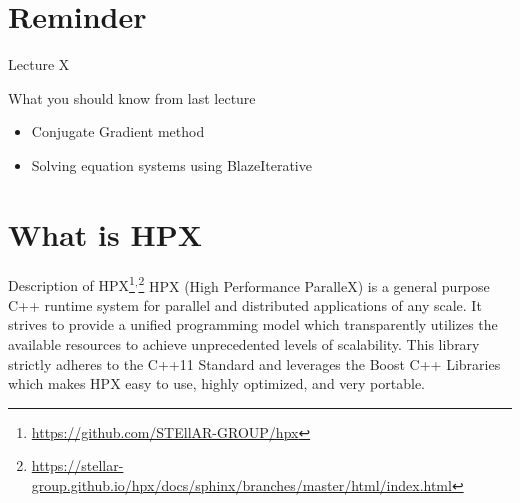 \documentclass[12pt,t]{beamer}
\title{\coursename}
\subtitle{Lecture 11: Introduction to HPX}
\date {
 \tiny \url{\courseurl}
\vspace{2cm}
\doclicenseThis  
  
}
\begin{document}
 {
    \frame {
        \titlepage
    }
}

\frame{

\tableofcontents

}


\section{Reminder}
\begin{frame}{Lecture X}
\begin{block}{What you should know from last lecture}
\begin{itemize}
\item Conjugate Gradient method
\item Solving equation systems using BlazeIterative
\end{itemize}
\end{block}
\end{frame}


\section{What is HPX}

\begin{frame}{Description of HPX\footnote{\tiny\url{https://github.com/STEllAR-GROUP/hpx}}$^,$\footnote{\tiny\url{https://stellar-group.github.io/hpx/docs/sphinx/branches/master/html/index.html}}}
HPX (High Performance ParalleX) is a general purpose C++ runtime system for parallel and distributed applications of any scale. It strives to provide a unified programming model which transparently utilizes the available resources to achieve unprecedented levels of scalability.  This library strictly adheres to the C++11 Standard and leverages the Boost C++ Libraries which makes HPX easy to use, highly optimized, and very portable. 
\end{frame}
\end{document}
